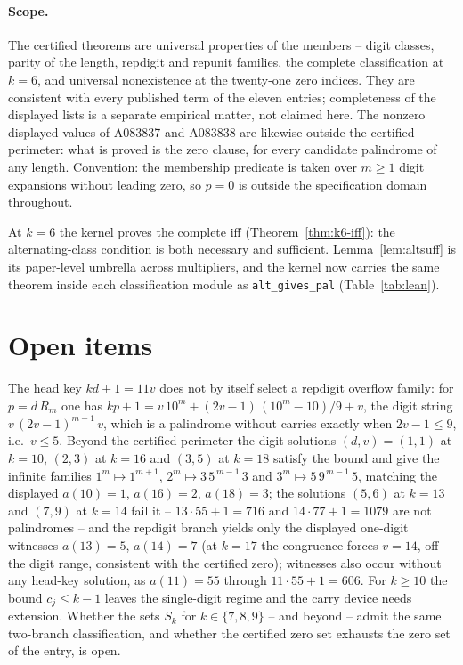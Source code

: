 \documentclass[12pt]{article}
\begin{document}
\paragraph{Scope.} The certified theorems are universal
properties of the members -- digit classes, parity of the
length, repdigit and repunit families, the complete
classification at $k = 6$, and universal nonexistence at
the twenty-one zero indices. They are consistent with
every published term of the eleven entries; completeness
of the displayed lists is a separate empirical matter,
not claimed here. The nonzero displayed values of
A083837 and A083838 are likewise outside the certified
perimeter: what is proved is the zero clause, for every
candidate palindrome of any length. Convention: the
membership predicate is taken over $m \ge 1$ digit
expansions without leading zero, so $p = 0$ is outside
the specification domain throughout.

\begin{remark}
\label{rem:sufftask}
At $k = 6$ the kernel proves the complete iff
(Theorem~\ref{thm:k6-iff}): the alternating-class
condition is both necessary and sufficient.
Lemma~\ref{lem:altsuff} is its paper-level umbrella
across multipliers, and the kernel now carries the same
theorem inside each classification module as
\texttt{alt\_gives\_pal} (Table~\ref{tab:lean}).
\end{remark}

\section{Open items}
\label{sec:open}

\begin{question}[the family beyond $k = 6$]
\label{q:beyond}
The head key $kd+1 = 11v$ does not by itself select a
repdigit overflow family: for $p = d\,R_m$ one has
$kp+1 = v\,10^m + (2v-1)\,(10^m-10)/9 + v$, the digit
string $v\,(2v-1)^{m-1}\,v$, which is a palindrome
without carries exactly when $2v-1 \le 9$, i.e.\
$v \le 5$. Beyond the certified perimeter the digit
solutions $(d,v) = (1,1)$ at $k = 10$, $(2,3)$ at
$k = 16$ and $(3,5)$ at $k = 18$ satisfy the bound and
give the infinite families $1^m \mapsto 1^{m+1}$,
$2^m \mapsto 3\,5^{\,m-1}\,3$ and
$3^m \mapsto 5\,9^{\,m-1}\,5$, matching the displayed
$a(10) = 1$, $a(16) = 2$, $a(18) = 3$; the solutions
$(5,6)$ at $k = 13$ and $(7,9)$ at $k = 14$ fail it --
$13\cdot55+1 = 716$ and $14\cdot77+1 = 1079$ are not
palindromes -- and the repdigit branch yields only the
displayed one-digit witnesses $a(13) = 5$, $a(14) = 7$
(at $k = 17$ the congruence forces $v = 14$, off the
digit range, consistent with the certified zero);
witnesses also occur without any head-key solution, as
$a(11) = 55$ through $11\cdot55+1 = 606$. For
$k \ge 10$ the bound $c_j \le k-1$ leaves the
single-digit regime and the carry device needs
extension. Whether the sets $S_k$ for
$k \in \{7,8,9\}$ -- and beyond -- admit the same
two-branch classification, and whether the certified
zero set exhausts the zero set of the entry, is open.
\end{question}
\end{document}
